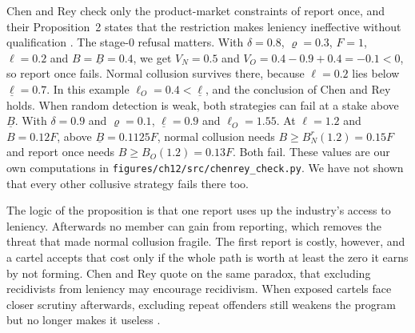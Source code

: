 Chen and Rey check only the product-market constraints of report once, and their Proposition~2 states that the
restriction makes leniency ineffective without qualification \citep[pp.~14--15]{ChenRey2013}. The stage-0 refusal
matters. With $\delta = 0.8$, $\varrho = 0.3$, $F = 1$, $\ell = 0.2$ and $B = \underline B = 0.4$, we get
$V_N = 0.5$ and $V_O = 0.4 - 0.9 + 0.4 = -0.1 < 0$, so report once fails. Normal collusion survives there, because
$\ell = 0.2$ lies below $\underline\ell = 0.7$. In this example $\ell_O = 0.4 < \underline\ell$, and the
conclusion of Chen and Rey holds. When random detection is weak, both strategies can fail at a stake above
$\underline B$. With $\delta = 0.9$ and
$\varrho = 0.1$, $\underline\ell = 0.9$ and $\ell_O = 1.55$. At $\ell = 1.2$ and $B = 0.12F$, above
$\underline B = 0.1125F$, normal collusion needs $B \ge B_N^r(1.2) = 0.15F$ and report once needs
$B \ge B_O(1.2) = 0.13F$. Both fail. These values are our own computations in
\texttt{figures/ch12/src/chenrey\_check.py}. We have not shown that every other collusive strategy fails there too.

The logic of the proposition is that one report uses up the industry's access to leniency. Afterwards no member can
gain from reporting, which removes the threat that made normal collusion fragile. The first report is costly,
however, and a cartel accepts that cost only if the whole path is worth at least the zero it earns by not forming.
Chen and Rey quote \citet{Wils2008} on the same
paradox, that excluding recidivists from leniency may encourage recidivism. When exposed cartels face closer scrutiny
afterwards, excluding repeat offenders still weakens the program but no longer makes it useless
\citep[p.~17]{ChenRey2013}.

